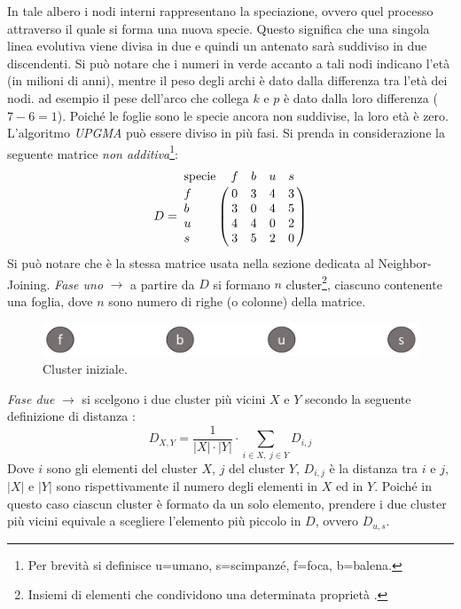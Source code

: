 \newline
In tale albero i nodi interni rappresentano la speciazione, ovvero quel processo attraverso il quale si forma una nuova specie. Questo significa che una singola linea evolutiva viene divisa in due \cite{speciationBritannica} e quindi un antenato sarà suddiviso in due discendenti. Si può notare che i numeri in verde accanto a tali nodi indicano l'età (in milioni di anni), mentre il peso degli archi è dato dalla differenza tra l'età dei nodi. ad esempio il pese dell'arco che collega $k$ e $p$ è dato dalla loro differenza ($7-6=1$). Poiché le foglie sono le specie  ancora non suddivise, la loro età è zero.
\newline
L'algoritmo \textit{UPGMA} può essere diviso in più fasi. Si prenda in considerazione la seguente matrice \textit{non additiva}\footnote{Per brevità si definisce u=umano, s=scimpanzé, f=foca, b=balena.}:
\[
D = \bordermatrix{\text{specie}&f&b&u&s\cr
                f& 0 & 3 & 4 & 3\cr
                b& 3 & 0 & 4 & 5\cr
                u& 4 & 4 & 0 & 2\cr
                s& 3 & 5 & 2 & 0}
\]
Si può notare che è la stessa matrice usata nella sezione dedicata al Neighbor-Joining.
\newline
\textit{Fase uno} $\rightarrow$ a partire da $D$ si formano $n$ cluster\footnote{Insiemi di elementi che condividono una determinata proprietà \cite{cambdrigeClusterDef}.}, ciascuno contenente una foglia, dove $n$ sono numero di righe (o colonne) della matrice.
\begin{figure}[h!]
\centering
	\includegraphics[height=1cm, width=12cm, keepaspectratio]{rooted_upgma_2.jpg}
 	\caption{Cluster iniziale.}
  	\label{fig:rooted_upgma_2}
\end{figure}
\newline
\textit{Fase due} $\rightarrow$ si scelgono i due cluster più vicini $X$ e $Y$ secondo la seguente definizione di distanza \cite{understandingBioinf}:
\[
D_{X,Y}=\frac{1}{\left | X \right |\cdot \left | Y \right |} \cdot \sum_{i\in X,\: j\in Y}D_{i,j}
\]
Dove $i$ sono gli elementi del cluster $X$, $j$ del cluster $Y$, $D_{i,j}$ è la distanza tra $i$ e $j$, $ \left | X \right | $ e $ \left | Y \right | $ sono rispettivamente il numero degli elementi in $X$ ed in $Y$. Poiché in questo caso  ciascun cluster è formato da un solo elemento, prendere i due cluster più vicini equivale a scegliere l'elemento più piccolo in $D$, ovvero $D_{u,s}$.

